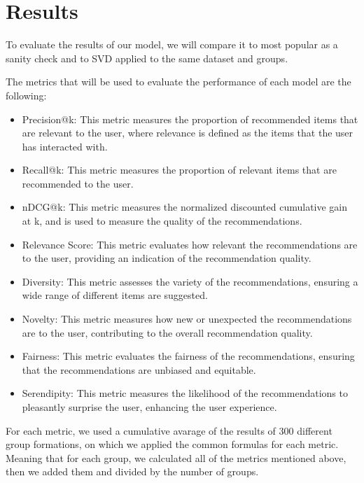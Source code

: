 \documentclass{article}
\begin{document}
\section{Results}

To evaluate the results of our model, we will compare it to most popular as a sanity check and to SVD applied to the same dataset and groups. %

The metrics that will be used to evaluate the performance of each model are the following:

\begin{itemize}
    \item Precision@k: This metric measures the proportion of recommended items that are relevant to the user, where relevance is defined as the items that the user has interacted with.
    \item Recall@k: This metric measures the proportion of relevant items that are recommended to the user.
    \item nDCG@k: This metric measures the normalized discounted cumulative gain at k, and is used to measure the quality of the recommendations.
    \item Relevance Score: This metric evaluates how relevant the recommendations are to the user, providing an indication of the recommendation quality.
    \item Diversity: This metric assesses the variety of the recommendations, ensuring a wide range of different items are suggested.
    \item Novelty: This metric measures how new or unexpected the recommendations are to the user, contributing to the overall recommendation quality.
    \item Fairness: This metric evaluates the fairness of the recommendations, ensuring that the recommendations are unbiased and equitable.
    \item Serendipity: This metric measures the likelihood of the recommendations to pleasantly surprise the user, enhancing the user experience.
\end{itemize}

For each metric, we used a cumulative avarage of the results of 300 different group formations, on which we applied the common formulas for each metric. Meaning that for each group, we calculated all of the metrics mentioned above, then we added them and divided by the number of groups.
\newline 
\end{document}
